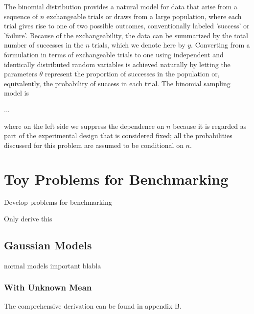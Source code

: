 The binomial distribution provides a natural model for data that arise from a sequence of $n$ exchangeable trials or draws from a large population, where each trial gives rise to one of two possible outcomes, conventionally labeled 'success' or 'failure'. Because of the exchangeability, the data can be summarized by the total number of successes in the $n$ trials, which we denote here by $y$. Converting from a formulation in terms of exchangeable trials to one using independent and identically distributed random variables is achieved naturally by letting the parameters $\theta$ represent the proportion of successes in the population or, equivalently, the probability of success in each trial. The binomial sampling model is 

...

where on the left side we suppress the dependence on $n$ because it is regarded as part of the experimental design that is considered fixed; all the probabilities discussed for this problem are assumed to be conditional on $n$.



\section{Toy Problems for Benchmarking}\label{sec:toy_problems}

Develop problems for benchmarking



Only derive this

\subsection{Gaussian Models}\label{sec:gaussian_models}

normal models important blabla

\subsubsection{With Unknown Mean}

The comprehensive derivation can be found in appendix B. 


